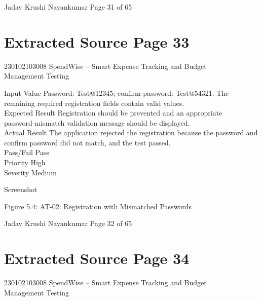\documentclass[12pt,a4paper]{report}
\begin{document}
\smallskip
Jadav Krushi Nayankumar                                                     Page 31 of 65\\ 

\clearpage
\section*{Extracted Source Page 33}
230102103008                         SpendWise – Smart Expense Tracking and Budget\\ 
Management Testing\\ 

\smallskip

\smallskip
Input Value              Password: Test@12345; confirm password: Test@54321. The\\ 
remaining required registration fields contain valid values.\\ 
Expected Result          Registration should be prevented and an appropriate\\ 
password-mismatch validation message should be displayed.\\ 
Actual Result            The application rejected the registration because the password and\\ 
confirm password did not match, and the test passed.\\ 
Pass/Fail                Pass\\ 
Priority                 High\\ 
Severity                 Medium\\ 

\smallskip

\smallskip
Screenshot\\ 

\smallskip

\smallskip

\smallskip

\smallskip
Figure 5.4: AT-02: Registration with Mismatched Passwords\\ 

\smallskip

\smallskip

\smallskip
Jadav Krushi Nayankumar                                                          Page 32 of 65\\ 

\clearpage
\section*{Extracted Source Page 34}
230102103008                      SpendWise – Smart Expense Tracking and Budget\\ 
Management Testing\\ 
\end{document}
